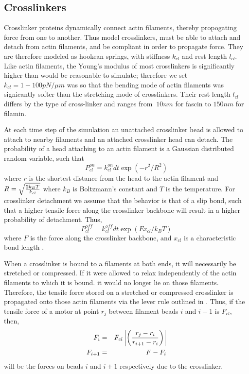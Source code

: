 \documentclass[12pt]{article}
\begin{document}
\subsection{Crosslinkers}
Crosslinker proteins dynamically connect actin filaments, thereby propogating force from one to
another. Thus model crosslinkers, must be able to attach and detach from actin filaments,
and be compliant in order to propagate force. They are therefore modeled as hookean springs, with stiffness
$k_{cl}$ and rest length $l_{cl}$. Like actin filaments, the Young's modulus of
most crosslinkers is significantly higher than would be reasonable to simulate; therefore we set $k_{cl} = 1-100pN/\mu m$ was
so that the bending mode of actin filaments was signicantly softer than the stretching mode of
crosslinkers. Their rest length $l_{cl}$ differs by the type of cross-linker and ranges from $~10 nm$ for fascin to $150 nm$
for filamin. 
\par
At each time step of the simulation an unattached crosslinker head is allowed to attach to nearby
filaments and an attached crosslinker head can detach. 
The probability of a head attaching to an actin filament is a Gaussian distributed random variable, such that
\begin{equation}
  P_{cl}^{on} = k_{cl}^{on}dt\exp(-r^2/R^2)
  \label{eqn:cl_on}
\end{equation} 
where $r$ is the shortest distance from the head to the actin filament and $R = \sqrt{2k_B T\over k_{cl}}$ 
where $k_B$ is Boltzmann's constant and $T$ is the temperature. 
For crosslinker detachment we assume that the behavior is that of a slip bond, such that a higher
tensile force along the crosslinker backbone will result in a higher probability of detachment. Thus, 
\begin{equation}
  P_{cl}^{off} = k_{cl}^{off} dt\exp{\left(  F x_{cl}/k_B T\right)}  
  \label{eqn:cl_off}
\end{equation}
where $F$ is the force along the crosslinker backbone, and $x_{cl}$ is a characteristic bond length \cite{stam2015}. 
\par
When a crosslinker is bound to a filaments at both ends, it will necessarily be stretched or compressed. 
If it were allowed to relax independently of the actin filaments to which it is bound. 
it would no longer lie on those filaments. Therefore, the tensile force stored on a stretched or compressed
crosslinker is propagated onto those actin filaments via the lever rule outlined in 
\cite{nedelec2002, gordon2012}. Thus, if the tensile force of a motor at point $r_j$ between filament beads $i$ and $i+1$ is
$F_{cl}$, then, 
\begin{eqnarray} 
  F_i &=& F_{cl}\left|\left( {r_j - r_i \over r_{i+1} - r_i }\right)\right|\\\nonumber
  F_{i+1} &=& F-F_i 
  \label{eqn:lever}
\end{eqnarray}
will be the forces on beads $i$ and $i+1$ respectively due to the crosslinker.
\end{document}
